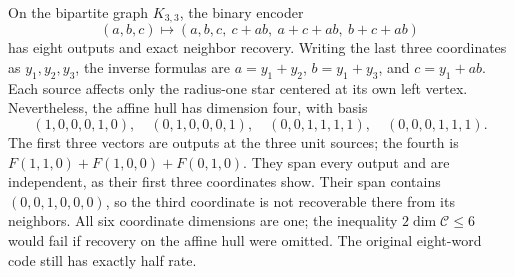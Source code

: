 \begin{example}
\label{ex:affine-hull}
On the bipartite graph $K_{3,3}$, the binary encoder
\[
 (a,b,c)\longmapsto
 (a,b,c,\ c+ab,\ a+c+ab,\ b+c+ab)
\]
has eight outputs and exact neighbor recovery. Writing the last three
coordinates as $y_1,y_2,y_3$, the inverse formulas are
$a=y_1+y_2$, $b=y_1+y_3$, and $c=y_1+ab$.
Each source affects only the radius-one star centered at its own
left vertex. Nevertheless, the affine hull has dimension four, with
basis
\[
 (1,0,0,0,1,0),\quad (0,1,0,0,0,1),\quad
 (0,0,1,1,1,1),\quad (0,0,0,1,1,1).
\]
The first three vectors are outputs at the three unit sources; the
fourth is $F(1,1,0)+F(1,0,0)+F(0,1,0)$. They span every output and
are independent, as their first three coordinates show. Their span
contains $(0,0,1,0,0,0)$, so the third coordinate is not recoverable
there from its neighbors. All six coordinate dimensions are one;
the inequality $2\dim\mathcal C\le6$ would fail if recovery on the
affine hull were omitted. The original eight-word code still has
exactly half rate.
\end{example}
